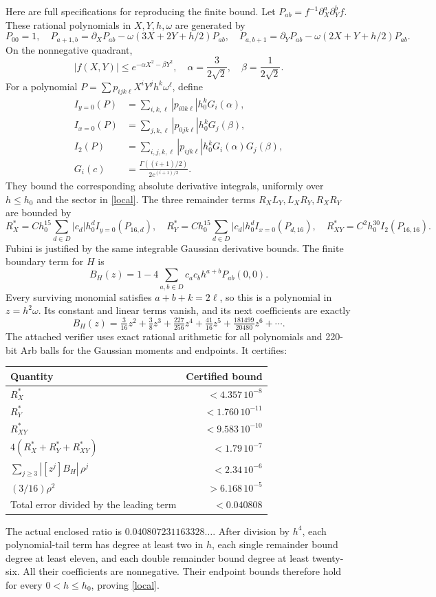 \documentclass[11pt]{article}
\begin{document}
Here are full specifications for reproducing the finite bound.
Let \(P_{ab}=f^{-1}\partial_X^a\partial_Y^bf\). These rational polynomials
in \(X,Y,h,\omega\) are generated by
\[
 P_{00}=1,\quad
 P_{a+1,b}=\partial_XP_{ab}-\omega(3X+2Y+h/2)P_{ab},\quad
 P_{a,b+1}=\partial_YP_{ab}-\omega(2X+Y+h/2)P_{ab}.
\]
On the nonnegative quadrant,
\[
 |f(X,Y)|\leq e^{-\alpha X^2-\beta Y^2},\quad
 \alpha=\frac3{2\sqrt2},\quad\beta=\frac1{2\sqrt2}.
\]
For a polynomial \(P=\sum p_{ijk\ell}X^iY^jh^k\omega^\ell\), define
\begin{align*}
 I_{y=0}(P)&=\sum_{i,k,\ell}|p_{i0k\ell}|h_0^kG_i(\alpha),\\
 I_{x=0}(P)&=\sum_{j,k,\ell}|p_{0jk\ell}|h_0^kG_j(\beta),\\
 I_2(P)&=\sum_{i,j,k,\ell}|p_{ijk\ell}|h_0^kG_i(\alpha)G_j(\beta),\\
 G_i(c)&=\frac{\Gamma((i+1)/2)}{2c^{(i+1)/2}}.
\end{align*}
They bound the corresponding absolute derivative integrals, uniformly
over \(h\leq h_0\) and the sector in \eqref{local}.
The three remainder terms \(R_XL_Y,L_XR_Y,R_XR_Y\) are bounded by
\[
 R_X^*=Ch_0^{15}\sum_{d\in D}|c_d|h_0^dI_{y=0}(P_{16,d}),\quad
 R_Y^*=Ch_0^{15}\sum_{d\in D}|c_d|h_0^dI_{x=0}(P_{d,16}),\quad
 R_{XY}^*=C^2h_0^{30}I_2(P_{16,16}).
\]
Fubini is justified by the same integrable Gaussian derivative bounds.
The finite boundary term for \(H\) is
\[
 B_H(z)=1-4\sum_{a,b\in D}c_ac_bh^{a+b}P_{ab}(0,0).
\]
Every surviving monomial satisfies \(a+b+k=2\ell\), so this is a
polynomial in \(z=h^2\omega\). Its constant and linear terms vanish, and
its next coefficients are exactly
\[
 B_H(z)=\tfrac3{16}z^2+\tfrac38z^3+\tfrac{227}{256}z^4
             +\tfrac{41}{16}z^5+\tfrac{181499}{20480}z^6+\cdots .
\]
The attached verifier uses exact rational arithmetic for all polynomials
and 220-bit Arb balls for the Gaussian moments and endpoints. It certifies:
\begin{center}
\begin{tabular}{lr}
\toprule
Quantity & Certified bound\\
\midrule
\(R_X^*\) & \(<4.357\,10^{-8}\)\\
\(R_Y^*\) & \(<1.760\,10^{-11}\)\\
\(R_{XY}^*\) & \(<9.583\,10^{-10}\)\\
\(4(R_X^*+R_Y^*+R_{XY}^*)\) & \(<1.79\,10^{-7}\)\\
\(\sum_{j\geq3}|[z^j]B_H|\,\rho^j\) & \(<2.34\,10^{-6}\)\\
\((3/16)\rho^2\) & \(>6.168\,10^{-5}\)\\
Total error divided by the leading term & \(<0.040808\)\\
\bottomrule
\end{tabular}
\end{center}
The actual enclosed ratio is \(0.040807231163328\ldots\).
After division by \(h^4\), each polynomial-tail term has degree at least
two in \(h\), each single remainder bound degree at least eleven, and
each double remainder bound degree at least twenty-six. All their
coefficients are nonnegative. Their endpoint bounds therefore hold for
every \(0<h\leq h_0\), proving \eqref{local}.
\end{document}
